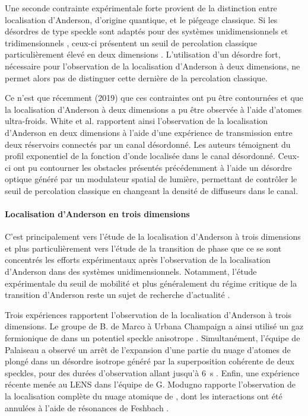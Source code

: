 Une seconde contrainte expérimentale forte provient de la distinction entre localisation d'Anderson, d'origine quantique, et le piégeage classique. Si les désordres de type speckle sont adaptés pour des systèmes unidimensionnels et tridimensionnels \citep{pilati2010dilute}, ceux-ci présentent un seuil de percolation classique particulièrement élevé en deux dimensions \citep{morong2015simulation}. L'utilisation d'un désordre fort, nécessaire pour l'observation de la localisation d'Anderson à deux dimensions, ne permet alors pas de distinguer cette dernière de la percolation classique.

Ce n'est que récemment (2019) que ces contraintes ont pu être contournées et que la localisation d'Anderson à deux dimensions a pu être observée à l'aide d'atomes ultra-froids. White et al. \citep{white2019observation} rapportent ainsi l'observation de la localisation d'Anderson en deux dimensions à l'aide d'une expérience de transmission entre deux réservoirs connectés par un canal désordonné. Les auteurs témoignent du profil exponentiel de la fonction d'onde localisée dans le canal désordonné. Ceux-ci ont pu contourner les obstacles présentés précédemment à l'aide un désordre optique généré par un modulateur spatial de lumière, permettant de contrôler le seuil de percolation classique en changeant la densité de diffuseurs dans le canal. 



\paragraph*{Localisation d'Anderson en trois dimensions}
C'est principalement vers l'étude de la localisation d'Anderson à trois dimensions et plus particulièrement vers l'étude de la transition de phase que ce se sont concentrés les efforts expérimentaux après l'observation de la localisation d'Anderson dans des systèmes unidimensionnels. Notamment, l'étude expérimentale du seuil de mobilité et plus généralement du régime critique de la transition d'Anderson reste un sujet de recherche d'actualité \citep{pasek2017anderson}.

Trois expériences rapportent l'observation de la localisation d'Anderson à trois dimensions. Le groupe de B. de Marco à Urbana Champaign a ainsi utilisé un gaz fermionique de  dans un potentiel speckle anisotrope \citep{kondov2011three}. Simultanément, l'équipe de Palaiseau a observé un arrêt de l'expansion d'une partie du nuage d'atomes de  plongé dans un désordre isotrope généré par la superposition cohérente de deux speckles, pour des durées d'observation allant jusqu'à \SI{6}{\second} \citep{jendrzejewski2012three}. Enfin, une expérience récente menée au LENS dans l'équipe de G. Modugno rapporte l'observation de la localisation complète du nuage atomique de , dont les interactions ont été annulées à l'aide de résonances de Feshbach \citep{semeghini2015measurement}.

